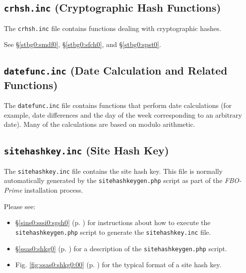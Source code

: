 \documentclass[letterpaper,10pt,titlepage]{article}
\newcommand{\productbasename}{FBO-Prime}
\begin{document}

\subsection{\texttt{crhsh.inc} (Cryptographic Hash Functions)}
\label{sphl0:schf0}

The \texttt{crhsh.inc} file 
contains functions dealing with cryptographic hashes.

See \S{}\ref{stbg0:smdf0}, \S{}\ref{stbg0:sfch0}, and \S{}\ref{stbg0:spst0}.


\subsection{\texttt{datefunc.inc} (Date Calculation and Related Functions)}
\label{sphl0:sdfc0}

The \texttt{datefunc.inc} file 
contains functions that perform date calculations
(for example, date differences and the day of the week corresponding
to an arbitrary date).  Many of the calculations are based on modulo
arithmetic.


\subsection{\texttt{sitehashkey.inc} (Site Hash Key)}
\label{sphl0:sshk0}

The \texttt{sitehashkey.inc} file contains
the site hash key.  This file is normally automatically generated by the
\texttt{sitehashkeygen.php}
script as part of the \emph{\productbasename{}} installation process.

Please see:

\begin{itemize}
\item \S{}\ref{sins0:sssi0:sgsh0} (p. \pageref{sins0:sssi0:sgsh0})
      for instructions about how to execute the \texttt{sitehashkeygen.php}
      script to generate the \texttt{sitehashkey.inc} file.
\item \S{}\ref{ssas0:shkg0} (p. \pageref{ssas0:shkg0})
      for a description of the \texttt{sitehashkeygen.php}
      script.
\item Fig. \ref{fig:ssas0:shkg0:00} (p. \pageref{fig:ssas0:shkg0:00})
      for the typical format of a site hash key.
\end{itemize}
\end{document}

